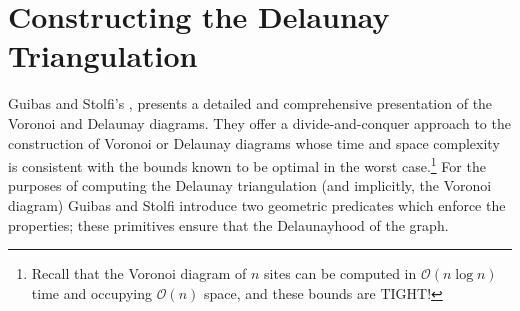 \documentclass[12pt,twoside]{reedthesis}
\begin{document}

  \clearpage

  \chapter{Constructing the Delaunay Triangulation}


    Guibas and Stolfi's  \cite{guibas}, presents a detailed and comprehensive presentation of the Voronoi and Delaunay diagrams. They offer a divide-and-conquer approach to the construction of Voronoi or Delaunay diagrams whose time and space complexity is consistent with the bounds known to be optimal in the worst case.\footnote{Recall that the Voronoi diagram of $n$ sites can be computed in $\mathcal{O}(n\log n)$ time and occupying $\mathcal{O}(n)$ space, and these bounds are TIGHT!} For the purposes of computing the Delaunay triangulation (and implicitly, the Voronoi diagram)  Guibas and Stolfi introduce two geometric predicates which enforce the  properties; these primitives ensure that the Delaunayhood of the graph. \par 
    
\end{document}
